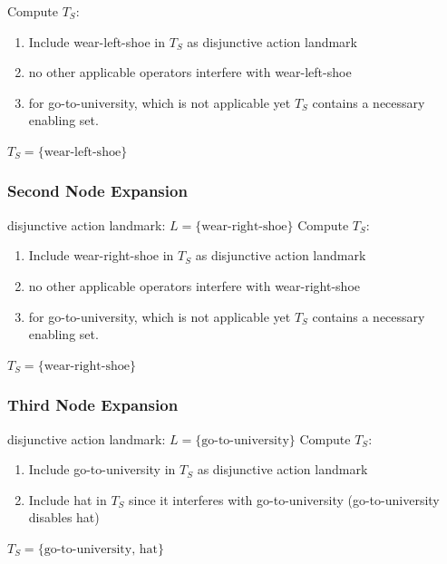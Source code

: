 \documentclass[11pt,a4paper]{article}
\begin{document}
Compute $T_S$:
\begin{enumerate}
\item Include wear-left-shoe in $T_S$ as disjunctive action landmark
\item no other applicable operators interfere with wear-left-shoe
\item for go-to-university, which is not applicable yet $T_S$ contains a necessary enabling set.
\end{enumerate}
$T_S = \{\text{wear-left-shoe}\}$

\subsubsection*{Second Node Expansion}
disjunctive action landmark: $L = \{\text{wear-right-shoe}\}$
Compute $T_S$:
\begin{enumerate}
\item Include wear-right-shoe in $T_S$ as disjunctive action landmark
\item no other applicable operators interfere with wear-right-shoe
\item for go-to-university, which is not applicable yet $T_S$ contains a necessary enabling set.
\end{enumerate}
$T_S = \{\text{wear-right-shoe}\}$

\subsubsection*{Third Node Expansion}
disjunctive action landmark: $L = \{\text{go-to-university}\}$
Compute $T_S$:
\begin{enumerate}
\item Include go-to-university in $T_S$ as disjunctive action landmark
\item Include hat in $T_S$ since it interferes with go-to-university (go-to-university disables hat)
\end{enumerate}
$T_S = \{\text{go-to-university, hat}\}$
\end{document}

